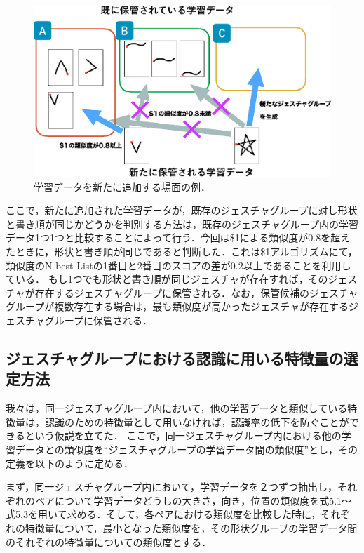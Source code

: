 \begin{figure} [h!]
	\begin{center}
		\includegraphics [width=0.9\hsize ]{img/make_gesture_group.eps}
	\end{center}
	\caption{学習データを新たに追加する場面の例．}
	\label{fig:make_gesture_group}
\end{figure}

ここで，新たに追加された学習データが，既存のジェスチャグループに対し形状と書き順が同じかどうかを判別する方法は，既存のジェスチャグループ内の学習データ1つ1つと比較することによって行う．今回は\$1による類似度が0.8を超えたときに，形状と書き順が同じであると判断した．これは\$1アルゴリズムにて，類似度のN-best Listの1番目と2番目のスコアの差が0.2以上であることを利用している．
もし1つでも形状と書き順が同じジェスチャが存在すれば，そのジェスチャが存在するジェスチャグループに保管される．なお，保管候補のジェスチャグループが複数存在する場合は，最も類似度が高かったジェスチャが存在するジェスチャグループに保管される．


\subsection{ジェスチャグループにおける認識に用いる特徴量の選定方法}
我々は，同一ジェスチャグループ内において，他の学習データと類似している特徴量は，認識のための特徴量として用いなければ，認識率の低下を防ぐことができるという仮説を立てた．
ここで，同一ジェスチャグループ内における他の学習データとの類似度を``ジェスチャグループの学習データ間の類似度''とし，その定義を以下のように定める．

まず，同一ジェスチャグループ内において，学習データを２つずつ抽出し，それぞれのペアについて学習データどうしの大きさ，向き，位置の類似度を式5.1〜式5.3を用いて求める．そして，各ペアにおける類似度を比較した時に，それぞれの特徴量について，最小となった類似度を，その形状グループの学習データ間のそれぞれの特徴量についての類似度とする．

